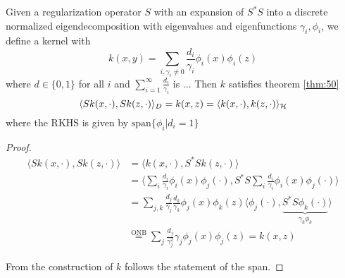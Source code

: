 \begin{theorem}\label{thm:51}
    Given a regularization operator $S$ with an expansion of $S^*S$ into a 
    discrete normalized eigendecomposition with eigenvalues and eigenfunctions $ \gamma_i,\phi_i$, we define
    a kernel with 
    \[k(x,y)=\sum_{i,\gamma_i\neq 0}\frac{d_i}{\gamma_i}\phi_i(x)\phi_i(z)\] 
    where $d\in\{0,1\}$ for all $i$ and $\sum_{i=1}^\infty\frac{d_i}{\gamma_i}$ is ... %
    Then $k$ satisfies theorem \ref{thm:50}
    \[\langle Sk(x,\cdot),Sk(z,\cdot)\rangle_D=k(x,z)=\langle k(x,\cdot),k(z,\cdot)\rangle_{\mathcal{H}}\]
    where the RKHS is given by $\text{span}\{\phi_i|d_i=1\}$
\end{theorem}


\begin{proof}
    \begin{align*}
        \langle Sk(x,\cdot),Sk(z,\cdot)\rangle &=\langle k(x,\cdot),S^*Sk(z,\cdot)\rangle\\
        &=\langle\sum_i \frac{d_i}{\gamma_i}\phi_i(x)\phi_j(\cdot),S^*S\sum_i \frac{d_i}{\gamma_i}\phi_i(x)\phi_j(\cdot)\rangle\\
        &=\sum_{j,k}\frac{d_j}{\gamma_j}\frac{d_k}{\gamma_k}\phi_j(x)\phi_k(z)\langle \phi_j(\cdot),\underbrace{S^*S\phi_k(\cdot)}_{\gamma_k\phi_k}\rangle\\
        &\stackrel{\text{ONB}}{=}\sum_{j}\frac{d_j}{\gamma_j^2}\gamma_j\phi_j(x)\phi_j(z)=k(x,z)
    \end{align*}

    From the construction of $k$ follows the statement of the span.
\end{proof}

